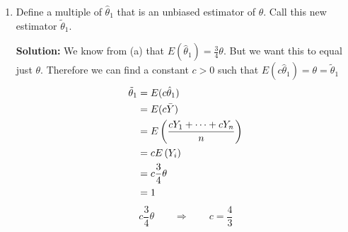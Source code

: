 \documentclass[12pt]{article}
\newcommand{\ybar}{\bar{Y}}
\newcommand{\E}[1]{E\left( {#1} \right)}
\begin{document}
\begin{enumerate}
\begin{enumerate}
        \newpage
        \item
        Define a multiple of $\hat{\theta}_1$ that is an unbiased estimator of $\theta$. Call this new estimator $\tilde{\theta}_1$.
                \begin{mybox}
            \textbf{Solution: } We know from (a) that $E(\hat{\theta}_1) = \frac{3}{4}\theta$. But we want this to equal just $\theta$. Therefore we can find a constant $c > 0$ such that
            $E(c\hat{\theta}_1) = \theta = \tilde{\theta}_1$
            \begin{align}
                \tilde{\theta}_1 &= E(c\hat{\theta}_1) \notag\\
                &= E(c\ybar) \notag\\ &= \E{\frac{cY_1 + \cdots + cY_n}{n}} \notag\\ &= c\E{Y_i} \notag\\ &= c\frac{3}{4}\theta \notag\\ &= 1 \notag
            \end{align}
            $$c\frac{3}{4}\theta \qquad \Longrightarrow \qquad c = \frac{4}{3} $$
            \begin{center}\color{magenta}\color{black}\end{center}
        \end{mybox}
        

\end{enumerate}
\end{enumerate}
\end{document}
